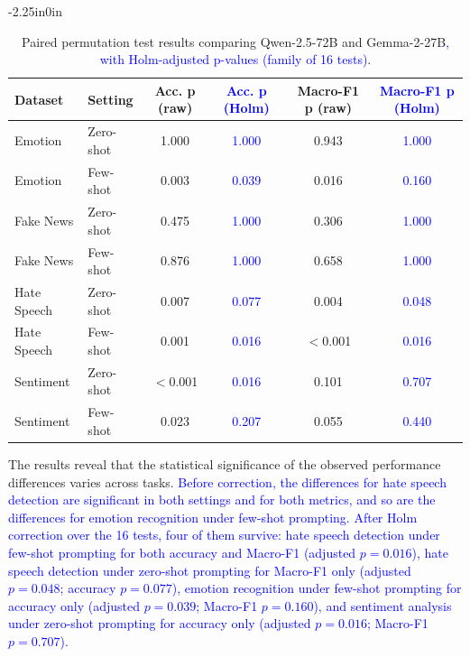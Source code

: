 \documentclass[10pt,letterpaper]{article}
\newcommand{\rev}[1]{\textcolor{blue}{#1}}
\begin{document}
\begin{table}[!t]
\begin{adjustwidth}{-2.25in}{0in}
\centering
\small
\caption{Paired permutation test results comparing Qwen-2.5-72B and Gemma-2-27B\rev{, with Holm-adjusted p-values (family of 16 tests)}.}
\label{tab:significance_results}
\renewcommand{\arraystretch}{1.1}
\setlength{\tabcolsep}{5pt}
\begin{tabular}{|l|l|c|c|c|c|}
\hline
\textbf{Dataset} & \textbf{Setting} & \textbf{Acc. p (raw)} & \rev{\textbf{Acc. p (Holm)}} & \textbf{Macro-F1 p (raw)} & \rev{\textbf{Macro-F1 p (Holm)}} \\ 
\hline
Emotion & Zero-shot & 1.000 & \rev{1.000} & 0.943 & \rev{1.000} \\ 
Emotion & Few-shot & 0.003 & \rev{0.039} & 0.016 & \rev{0.160} \\ 
\hline
Fake News & Zero-shot & 0.475 & \rev{1.000} & 0.306 & \rev{1.000} \\ 
Fake News & Few-shot & 0.876 & \rev{1.000} & 0.658 & \rev{1.000} \\ 
\hline
Hate Speech & Zero-shot & 0.007 & \rev{0.077} & 0.004 & \rev{0.048} \\ 
Hate Speech & Few-shot & 0.001 & \rev{0.016} & $<$0.001 & \rev{0.016} \\ 
\hline
Sentiment & Zero-shot & $<$0.001 & \rev{0.016} & 0.101 & \rev{0.707} \\ 
Sentiment & Few-shot & 0.023 & \rev{0.207} & 0.055 & \rev{0.440} \\ 
\hline
\end{tabular}
\end{adjustwidth}
\end{table}

The results reveal that the statistical significance of the observed performance differences varies across tasks. \rev{Before correction, the differences for hate speech detection are significant in both settings and for both metrics, and so are the differences for emotion recognition under few-shot prompting. After Holm correction over the 16 tests, four of them survive: hate speech detection under few-shot prompting for both accuracy and Macro-F1 (adjusted $p = 0.016$), hate speech detection under zero-shot prompting for Macro-F1 only (adjusted $p = 0.048$; accuracy $p = 0.077$), emotion recognition under few-shot prompting for accuracy only (adjusted $p = 0.039$; Macro-F1 $p = 0.160$), and sentiment analysis under zero-shot prompting for accuracy only (adjusted $p = 0.016$; Macro-F1 $p = 0.707$).}
\end{document}
